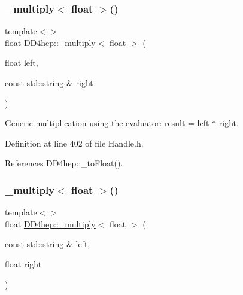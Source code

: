 \subsubsection{\texorpdfstring{\+\_\+multiply$<$ float $>$()}{\_multiply< float >()}\hspace{0.1cm}{\footnotesize\ttfamily [2/3]}}
{\footnotesize\ttfamily template$<$$>$ \\
float \hyperlink{group___d_d4_h_e_p___g_e_o_m_e_t_r_y_gab860c2299e2eb50e537c5079fb0c9c51}{D\+D4hep\+::\+\_\+multiply}$<$ float $>$ (\begin{DoxyParamCaption}\item[{float}]{left,  }\item[{const std\+::string \&}]{right }\end{DoxyParamCaption})\hspace{0.3cm}{\ttfamily [inline]}}



Generic multiplication using the evaluator\+: result = left $\ast$ right. 



Definition at line 402 of file Handle.\+h.



References D\+D4hep\+::\+\_\+to\+Float().

\hypertarget{group___d_d4_h_e_p___g_e_o_m_e_t_r_y_gac92210239021647a7dc57e2838002263}{}\label{group___d_d4_h_e_p___g_e_o_m_e_t_r_y_gac92210239021647a7dc57e2838002263} 
\subsubsection{\texorpdfstring{\+\_\+multiply$<$ float $>$()}{\_multiply< float >()}\hspace{0.1cm}{\footnotesize\ttfamily [3/3]}}
{\footnotesize\ttfamily template$<$$>$ \\
float \hyperlink{group___d_d4_h_e_p___g_e_o_m_e_t_r_y_gab860c2299e2eb50e537c5079fb0c9c51}{D\+D4hep\+::\+\_\+multiply}$<$ float $>$ (\begin{DoxyParamCaption}\item[{const std\+::string \&}]{left,  }\item[{float}]{right }\end{DoxyParamCaption})\hspace{0.3cm}{\ttfamily [inline]}}



